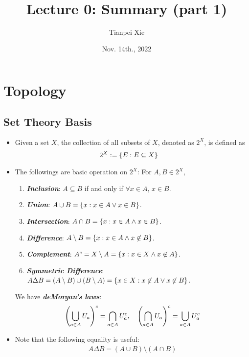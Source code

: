\documentclass[11pt]{article}
\begin{document}
\title{Lecture 0:  Summary (part 1)}
\author{ Tianpei Xie}
\date{ Nov. 14th., 2022 }
\maketitle
\tableofcontents
\newpage
\section{Topology}
\subsection{Set Theory Basis}
\begin{itemize}
\item \begin{definition}
Given a set $X$, the collection of all subsets of $X$, denoted as $2^X$, is defined as
\begin{align*}
2^X &:= \left\{E: E \subseteq X\right\}
\end{align*}
\end{definition}

\item \begin{remark}
The followings are basic operation on $2^X$: For $A, B \in 2^X$,
\begin{enumerate}
\item \emph{\textbf{Inclusion}}:   $A \subseteq B$ if and only if $\forall x \in A$, $x \in B$.
\item \emph{\textbf{Union}}:  $A \cup B = \left\{x: x \in A \lor x \in B\right\}$.
\item \emph{\textbf{Intersection}}:  $A \cap B = \left\{x: x \in A \land x \in B\right\}$.
\item \emph{\textbf{Difference}}:  $A \setminus B = \left\{x: x \in A \land x \not\in B\right\}$.
\item \emph{\textbf{Complement}}: $A^{c} = X \setminus A = \left\{x: x \in X \land x \not\in A\right\}$.
\item \emph{\textbf{Symmetric Difference}}:  $A \Delta B = (A \setminus B) \cup (B \setminus A) = \left\{x \in X: x \not\in A \lor x \not\in B\right\}$.
\end{enumerate}
We have \emph{\textbf{deMorgan's laws}}:
\begin{align*}
\left(\bigcup_{a \in A}U_a\right)^c = \bigcap_{a \in A}U_a^c, \quad \left(\bigcap_{a \in A}U_a\right)^c = \bigcup_{a \in A}U_a^c
\end{align*}
\end{remark}

\item \begin{remark}
Note that the following equality is useful:
\begin{align*}
A \Delta B = (A \cup B) \setminus (A \cap B)
\end{align*}
\end{remark}


\end{itemize}
\end{document}
